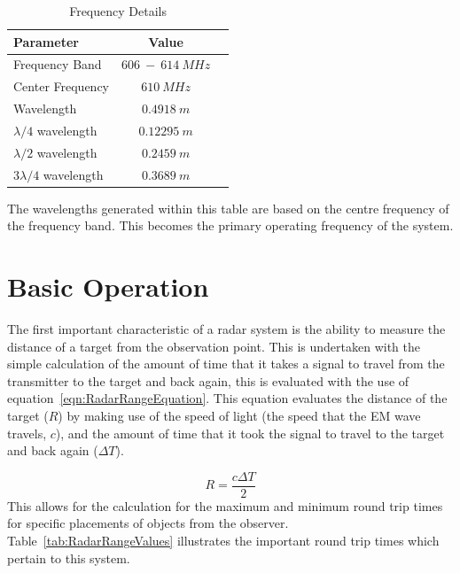 \documentclass[11pt]{witseiepaper}
\begin{document}
\begin{bibunit}[witseie]
\begin{table}
    \caption{Frequency Details}
    \label{tab:FrequencyDetails}
    \begin{center}
        \begin{tabular}{p{70mm}cp{70mm}}
            \hline 
            Parameter & Value \\
            \hline
            Frequency Band & $606~-~614~MHz$ \\
            Center Frequency & $610~MHz$ \\
            Wavelength & $0.4918~m$ \\
            $\lambda /4$ wavelength & $0.12295~m$ \\
            $\lambda /2$ wavelength & $0.2459~m$ \\
            $3 \lambda /4$ wavelength & $0.3689~m$ \\                
        \end{tabular}
    \end{center}
\end{table}
The wavelengths generated within this table are based on the centre frequency of the frequency band. This becomes the primary operating frequency of the system.



\section{Basic Operation} \label{sec:BasicOperation}
The first important characteristic of a radar system is the ability to measure the distance of a target from the observation point. This is undertaken with the simple calculation of the amount of time that it takes a signal to travel from the transmitter to the target and back again, this is evaluated with the use of equation~\ref{eqn:RadarRangeEquation}. This equation evaluates the distance of the target ($R$) by making use of the speed of light (the speed that the EM wave travels, $c$), and the amount of time that it took the signal to travel to the target and back again ($\Delta T$).

\begin{equation} \label{eqn:RadarRangeEquation}
    R = \frac{c \Delta T}{2}
\end{equation}
This allows for the calculation for the maximum and minimum round trip times for specific placements of objects from the observer. Table~\ref{tab:RadarRangeValues} illustrates the important round trip times which pertain to this system.


\end{bibunit}
\end{document}
